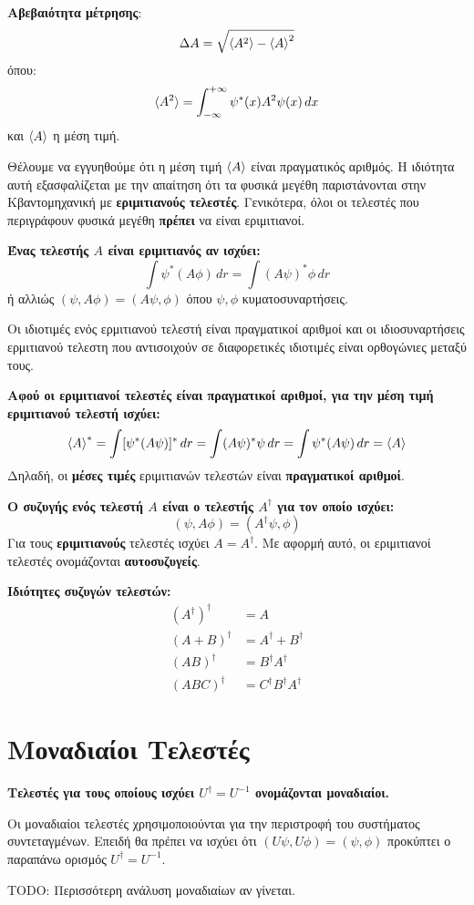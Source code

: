 \documentclass[11pt, oneside]{article}   	%
\newcommand{\definition}[1]{
	\begin{tcolorbox}[colback=blue!5!white,colframe=blue!75!black,title=\textbf{Ορισμός}]
		\begin{center}
			#1
		\end{center}
	\end{tcolorbox}
}
\newcommand{\property}[1]{
	\begin{tcolorbox}[colback=red!5!white,colframe=red!75!black,title=\textbf{Ιδιότητα}]
		\begin{center}
			#1
		\end{center}
	\end{tcolorbox}
}
\newcommand{\suggestion}[1]{
	\begin{tcolorbox}[colback=green!5!white,colframe=green!75!black,title=\textbf{Πρόταση}]
		\begin{center}
			#1
		\end{center}
	\end{tcolorbox}
}
\begin{document}
\definition{\textbf{Αβεβαιότητα μέτρησης}:\[\Delta A = \sqrt{\braket{A^2}-\braket{A}^2}\] όπου: \[\braket{A^2} = \int_{-\infty}^{+\infty} \psi^*(x) A^2 \psi(x) \, dx\] και $\braket{A}$ η μέση τιμή.}

Θέλουμε να εγγυηθούμε ότι η μέση τιμή $\braket{A}$ είναι πραγματικός αριθμός. Η ιδιότητα αυτή εξασφαλίζεται με την απαίτηση ότι τα φυσικά μεγέθη παριστάνονται στην Κβαντομηχανική με \textbf{εριμιτιανούς τελεστές}. Γενικότερα, όλοι οι τελεστές που περιγράφουν φυσικά μεγέθη \textbf{πρέπει} να είναι εριμιτιανοί.

\definition{\textbf{Ένας τελεστής $A$ είναι εριμιτιανός αν ισχύει:} \[\int \psi^* (A\phi) \, dr = \int(A\psi)^* \phi \, dr\] ή αλλιώς $(\psi,A\phi) = (A\psi,\phi)$ όπου $\psi,\phi$ κυματοσυναρτήσεις.}

Οι ιδιοτιμές ενός ερμιτιανού τελεστή είναι πραγματικοί αριθμοί και οι ιδιοσυναρτήσεις ερμιτιανού τελεστη που αντισοιχούν σε διαφορετικές ιδιοτιμές είναι ορθογώνιες μεταξύ τους.

\suggestion{\textbf{Αφού οι εριμιτιανοί τελεστές είναι πραγματικοί αριθμοί, για την μέση τιμή εριμιτιανού τελεστή ισχύει:} \[\braket{A}^* = \int[\psi^* (A\psi)]^* \, dr = \int(A\psi)^* \psi \, dr = \int \psi^* (A\psi) \, dr = \braket{A}\]
Δηλαδή, οι \textbf{μέσες τιμές} εριμιτιανών τελεστών είναι \textbf{πραγματικοί αριθμοί}.}

\definition{\textbf{Ο συζυγής ενός τελεστή $A$ είναι ο τελεστής $A^\dagger$ για τον οποίο ισχύει:}\[(\psi,A\phi)=(A^\dagger \psi,\phi)\]
Για τους \textbf{εριμιτιανούς} τελεστές ισχύει $A=A^\dagger$. Με αφορμή αυτό, οι εριμιτιανοί τελεστές ονομάζονται \textbf{αυτοσυζυγείς}.}

\property{\textbf{Ιδιότητες συζυγών τελεστών:}
\begin{align*}
	(A^\dagger)^\dagger &= A \\
	(A+B)^\dagger &= A^\dagger + B^\dagger \\
	(AB)^\dagger &= B^\dagger A^\dagger \\
	(ABC)^\dagger &= C^\dagger B^\dagger A^\dagger
	\end{align*}}

\section{Μοναδιαίοι Τελεστές}

\definition{\textbf{Τελεστές για τους οποίους ισχύει $U^\dagger = U^{-1}$ ονομάζονται μοναδιαίοι.}}

Οι μοναδιαίοι τελεστές χρησιμοποιούνται για την περιστροφή του συστήματος συντεταγμένων. Επειδή θα πρέπει να ισχύει ότι $(U\psi,U\phi) = (\psi,\phi)$ προκύπτει ο παραπάνω ορισμός $U^\dagger = U^{-1}$.

TODO: Περισσότερη ανάλυση μοναδιαίων αν γίνεται.
\end{document}
